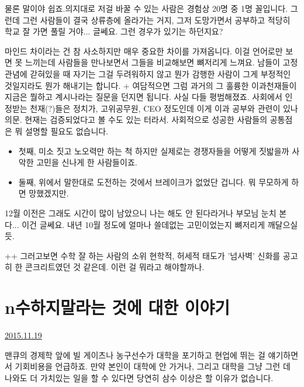 물론 말이야 쉽죠.의지대로 저걸 바꿀 수 있는 사람은 경험상 20명 중 1명 꼴입니다.    그런데 그런 사람들이 결국 상류층에 올라가는 거지, 그저 도망가면서 공부하고 적당히 학교 잘 가면 풀릴 거야... 글쎄요.   그런 경우가 있기는 하던지요?
\vspace{5mm}

마인드 차이라는 건 참 사소하지만 매우 중요한 차이를 가져옵니다.   이걸 언어로만 보면 못 느끼는데 사람들을 만나보면서 그들을 비교해보면 뼈저리게 느껴요.   남들이 고정관념에 갇혀있을 때 자기는 그걸 두려워하지 않고 뭔가 감행한 사람이 그게 부정적인 것일지라도 뭔가 해내기는 합니다.   
\vspace{5mm}
+   여담적으면 그럼 과거의 그 훌륭한 이과천재들이 지금은 뭘하고 계시나라는 질문을 던지면 됩니다.  사실 다들 평범해졌죠.  사회에서 인정받는 천재(?)들은 정치가, 고위공무원, CEO 정도인데 이게 이과 공부와 관련이 있나 의문.    현재는 검증되었다고 볼 수도 있는 터라서.  사회적으로 성공한 사람들의 공통점은 뭐 설명할 필요도 없습니다.  

\begin{itemize}
    
    \item  첫째, 미소 짓고 노오력만 하는 척 하지만 실제로는 경쟁자들을 어떻게 짓밟을까 사악한 고민을 신나게 한 사람들이죠.  
    \item 둘째, 위에서 말한대로 도전하는 것에서 브레이크가 없었단 겁니다. 뭐 무모하게 하면 망했겠지만.  
\end{itemize}



12월 이전은 그래도 시간이 많이 남았으니 나는 해도 안 된다라거나 부모님 눈치 본다... 이건 글쎄요.  내년 10월 정도에 얼마나 쓸데없는 고민이었는지 뼈저리게 깨달으실 듯.  

\vspace{5mm}
++  그러고보면 수학 잘 하는 사람의 소위 현학적, 허세적 태도가 '넘사벽' 신화를 공고히 한 콘크리트였던 것 같은데.  이런 걸 뭐라고 해야할까나.



\section{n수하지말라는 것에 대한 이야기}
\href{https://www.kockoc.com/Apoc/501678}{2015.11.19}

\vspace{5mm}

맨큐의 경제학 앞에 빌 게이츠나 농구선수가
대학을 포기하고 현업에 뛰는 걸 얘기하면서 기회비용을 언급하죠.
만약 본인이 대학에 안 가거나, 그리고 대학을 그냥 그런 데 나와도 더 가치있는 일을 할 수 있다면
당연히 삼수 이상은 할 이유가 없습니다.
\vspace{5mm}

